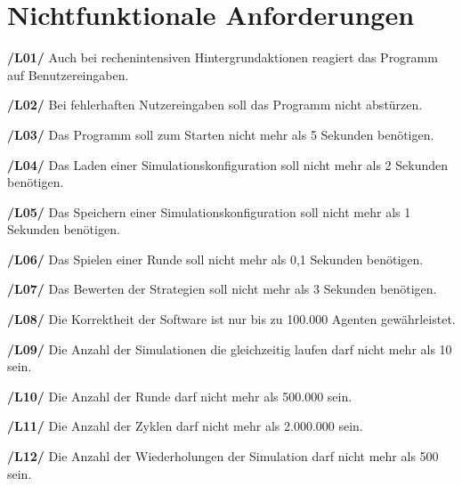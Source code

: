 \section{Nichtfunktionale Anforderungen}

\textbf{/L01/ }
Auch bei rechenintensiven Hintergrundaktionen reagiert das Programm auf Benutzereingaben.

\textbf{/L02/}
Bei fehlerhaften Nutzereingaben soll das Programm nicht abstürzen.

\textbf{/L03/}
Das Programm soll zum Starten nicht mehr als 5 Sekunden benötigen.

\textbf{/L04/}
Das Laden einer Simulationskonfiguration soll nicht mehr als 2 Sekunden benötigen.

\textbf{/L05/}
Das Speichern einer Simulationskonfiguration soll nicht mehr als 1 Sekunden benötigen.

\textbf{/L06/}
Das Spielen einer Runde soll nicht mehr als 0,1 Sekunden benötigen.

\textbf{/L07/}
Das Bewerten der Strategien soll nicht mehr als 3 Sekunden benötigen.

\textbf{/L08/}
Die Korrektheit der Software ist nur bis zu 100.000 Agenten gewährleistet.

\textbf{/L09/}
Die Anzahl der Simulationen die gleichzeitig laufen darf nicht mehr als 10 sein.

\textbf{/L10/}
Die Anzahl der Runde darf nicht mehr als 500.000 sein.

\textbf{/L11/}
Die Anzahl der Zyklen darf nicht mehr als 2.000.000 sein.

\textbf{/L12/}
Die Anzahl der Wiederholungen der Simulation darf nicht mehr als 500 sein.